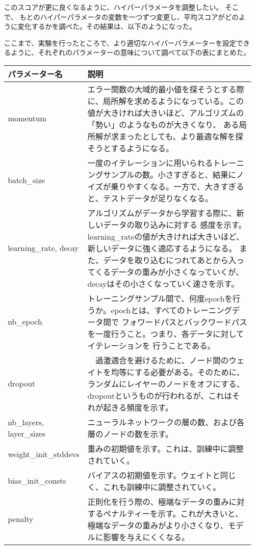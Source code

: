 \documentclass[a4j,11pt]{jarticle}
\begin{document}
このスコアが更に良くなるように、ハイパーパラメータを調整したい。
そこで、
もとのハイパーパラメータの変数を一つずつ変更し、平均スコアがどのように変化するかを調べた。その結果は、以下のようになった。


ここまで、実験を行ったところで、より適切なハイパーパラメーターを設定できるように、それぞれのパラメーターの意味について調べて以下の表にまとめた。

\begin{table}[htb]
	\begin{tabular}{|l||l|} \hline
		パラメーター名        & 説明　\\ \hline \hline
		momentum             & 
エラー関数の大域的最小値を探そうとする際に、局所解を求めるようになっている。この値が大きければ大きいほど、アルゴリズムの「勢い」のようなものが大きくなり、
ある局所解が求まったとしても、より最適な解を探そうとするようになる。\\ \hline
		batch\_size           & 
一度のイテレーションに用いられるトレーニングサンプルの数。小さすぎると、結果にノイズが乗りやすくなる。一方で、大きすぎると、テストデータが足りなくなる。 \\ \hline
		learning\_rate, decay &
アルゴリズムがデータから学習する際に、新しいデータの取り込みに対する
感度を示す。learning\_rateの値が大きければ大きいほど、新しいデータに強く適応するようになる。
また、データを取り込むにつれてあとから入ってくるデータの重みが小さくなっていくが、decayはその小さくなっていく速さを示す。\\ \hline
		nb\_epoch	     &
トレーニングサンプル間で、何度epochを行うか。epochとは、すべてのトレーニングデータ間で
フォワードパスとバックワードパスを一度行うこと。つまり、各データに対してイテレーションを
行うことである。\\ \hline
		dropout              &　過激適合を避けるために、ノード間のウェイトを均等にする必要がある。そのために、ランダムにレイヤーのノードをオフにする、
dropoutというものが行われるが、これはそれが起きる頻度を示す。\\ \hline
		nb\_layers, layer\_sizes &
ニューラルネットワークの層の数、および各層のノードの数を示す。\\ \hline
		weight\_init\_stddevs  &
重みの初期値を示す。これは、訓練中に調整されていく。\\ \hline
		bias\_init\_consts     &
バイアスの初期値を示す。ウェイトと同じく、これも訓練中に調整されていく。\\ \hline
		penalty              &
正則化を行う際の、極端なデータの重みに対するペナルティーを示す。これが大きいと、極端なデータの重みがより小さくなり、モデルに影響を与えにくくなる。\\ \hline
	\end{tabular}
\end{table}
\end{document}
